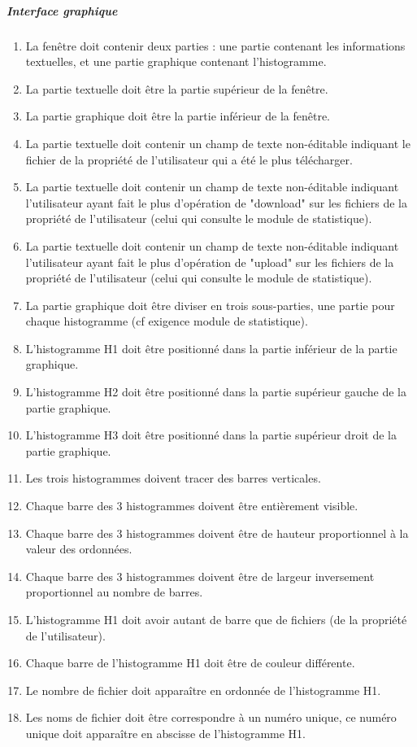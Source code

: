 \documentclass[10pt,a4paper]{report}
\begin{document}
	
	\subparagraph{Interface graphique}
		\begin{enumerate}
			\item La fenêtre doit contenir deux parties : une partie contenant les informations textuelles, et une partie graphique contenant l'histogramme.
			\item La partie textuelle doit être la partie supérieur de la fenêtre.
			\item La partie graphique doit être la partie inférieur de la fenêtre.
			\item La partie textuelle doit contenir un champ de texte non-éditable indiquant le fichier de la propriété de l'utilisateur qui a été le plus télécharger.
			\item La partie textuelle doit contenir un champ de texte non-éditable indiquant l'utilisateur ayant fait le plus d'opération de "download" sur les fichiers de la propriété de l'utilisateur (celui qui consulte le module de statistique).
			\item La partie textuelle doit contenir un champ de texte non-éditable indiquant l'utilisateur ayant fait le plus d'opération de "upload" sur les fichiers de la propriété de l'utilisateur (celui qui consulte le module de statistique).
			\item La partie graphique doit être diviser en trois sous-parties, une partie pour chaque histogramme (cf exigence module de statistique).
			\item L'histogramme H1 doit être positionné dans la partie inférieur de la partie graphique.
			\item L'histogramme H2 doit être positionné dans la partie supérieur gauche de la partie graphique.
			\item L'histogramme H3 doit être positionné dans la partie supérieur droit de la partie graphique.
			\item Les trois histogrammes doivent tracer des barres verticales.
			\item Chaque barre des 3 histogrammes doivent être entièrement visible.
			\item Chaque barre des 3 histogrammes doivent être de hauteur proportionnel à la valeur des ordonnées.
			\item Chaque barre des 3 histogrammes doivent être de largeur inversement proportionnel au nombre de barres.

			\item L'histogramme H1 doit avoir autant de barre que de fichiers (de la propriété de l'utilisateur).
			\item Chaque barre de l'histogramme H1 doit être de couleur différente.
			\item Le nombre de fichier doit apparaître en ordonnée de l'histogramme H1.
			\item Les noms de fichier doit être correspondre à un numéro unique, ce numéro unique doit apparaître en abscisse de l'histogramme H1.


\end{enumerate}
\end{document}
